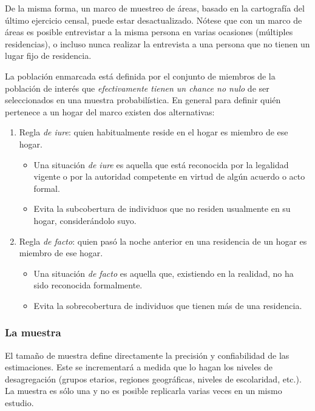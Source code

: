 \documentclass[
  10pt,
  spanish,
]{book}
\providecommand{\tightlist}{%
  \setlength{\itemsep}{0pt}\setlength{\parskip}{0pt}}
\begin{document}
De la misma forma, un marco de muestreo de áreas, basado en la cartografía del último ejercicio censal, puede estar desactualizado. Nótese que con un marco de áreas es posible entrevistar a la misma persona en varias ocasiones (múltiples residencias), o incluso nunca realizar la entrevista a una persona que no tienen un lugar fijo de residencia.

La población enmarcada está definida por el conjunto de miembros de la población de interés que \emph{efectivamente tienen un chance no nulo} de ser seleccionados en una muestra probabilística. En general para definir quién pertenece a un hogar del marco existen dos alternativas:

\begin{enumerate}
\def\labelenumi{\arabic{enumi}.}
\tightlist
\item
  Regla \emph{de iure}: quien habitualmente reside en el hogar es miembro de ese hogar.

  \begin{itemize}
  \tightlist
  \item
    Una situación \emph{de iure} es aquella que está reconocida por la legalidad vigente o por la autoridad competente en virtud de algún acuerdo o acto formal.
  \item
    Evita la subcobertura de individuos que no residen usualmente en su hogar, considerándolo suyo.
  \end{itemize}
\item
  Regla \emph{de facto}: quien pasó la noche anterior en una residencia de un hogar es miembro de ese hogar.

  \begin{itemize}
  \tightlist
  \item
    Una situación \emph{de facto} es aquella que, existiendo en la realidad, no ha sido reconocida formalmente.
  \item
    Evita la sobrecobertura de individuos que tienen más de una residencia.
  \end{itemize}
\end{enumerate}

\hypertarget{la-muestra}{%
\subsubsection*{La muestra}\label{la-muestra}}

El tamaño de muestra define directamente la precisión y confiabilidad de las estimaciones. Este se incrementará a medida que lo hagan los niveles de desagregación (grupos etarios, regiones geográficas, niveles de escolaridad, etc.). La muestra es sólo una y no es posible replicarla varias veces en un mismo estudio.
\end{document}
